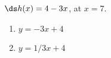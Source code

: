 {$\ds h(x) = 4-3x$, at $x=7$.
}
{\begin{enumerate}
\item		$y = -3x+4$
\item		$y = 1/3x+4$
\end{enumerate}
}
